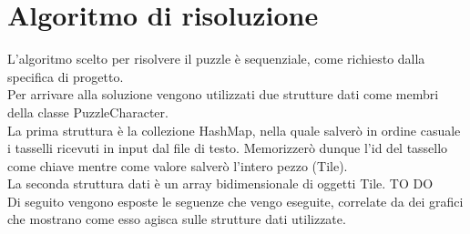 % 
%
% 
%

\section{Algoritmo di risoluzione}
L'algoritmo scelto per risolvere il puzzle è sequenziale, come richiesto dalla specifica di progetto. \\
Per arrivare alla soluzione vengono utilizzati due strutture dati come membri della classe PuzzleCharacter. \\
La prima struttura è la collezione HashMap, nella quale salverò in ordine casuale i tasselli ricevuti in input dal file di testo. Memorizzerò dunque l'id del tassello come chiave mentre come valore salverò l'intero pezzo (Tile). \\
La seconda struttura dati è un array bidimensionale di oggetti Tile. TO DO\\
Di seguito vengono esposte le seguenze che vengo eseguite, correlate da dei grafici che mostrano come esso agisca sulle strutture dati utilizzate.

